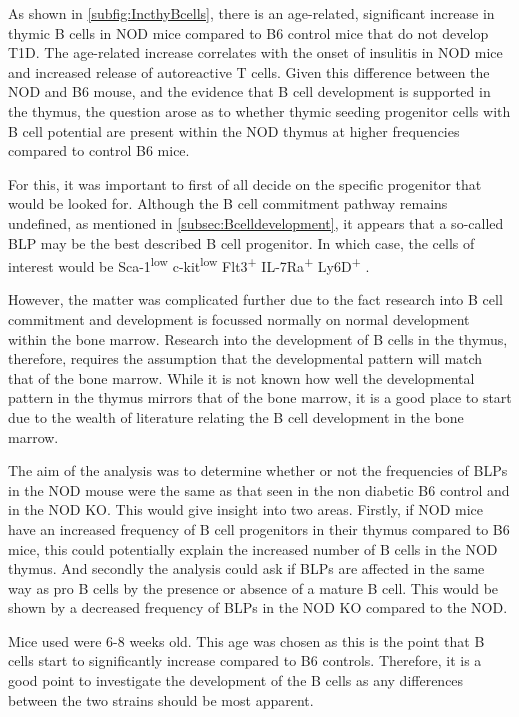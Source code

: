 As shown in \cref{subfig:IncthyBcells}, there is an age-related, significant increase in thymic B cells in NOD mice compared to B6 control mice that do not develop T1D.
The age-related increase correlates with the onset of insulitis in NOD mice and increased release of autoreactive T cells.
Given this difference between the NOD and B6 mouse, and the evidence that B cell development is supported in the thymus, the question arose as to whether thymic seeding progenitor cells with B cell potential are present within the NOD thymus at higher frequencies compared to control B6 mice.

For this, it was important to first of all decide on the specific progenitor that would be looked for.
Although the B cell commitment pathway remains undefined, as mentioned in \cref{subsec:Bcelldevelopment}, it appears that a so-called BLP may be the best described B cell progenitor.
In which case, the cells of interest would be Sca-1\textsuperscript{low} c-kit\textsuperscript{low} Flt3\textsuperscript{+} IL-7Ra\textsuperscript{+} Ly6D\textsuperscript{+} \citep{Mansson2010, Inlay2009, Zhang2013}.

However, the matter was complicated further due to the fact research into B cell commitment and development is focussed normally on normal development within the bone marrow.
Research into the development of B cells in the thymus, therefore, requires the assumption that the developmental pattern will match that of the bone marrow.
While it is not known how well the developmental pattern in the thymus mirrors that of the bone marrow, it is a good place to start due to the wealth of literature relating the B cell development in the bone marrow.

The aim of the analysis was to determine whether or not the frequencies of BLPs in the NOD mouse were the same as that seen in the non diabetic B6 control and in the NOD KO.
This would give insight into two areas.
Firstly, if NOD mice have an increased frequency of B cell progenitors in their thymus compared to B6 mice, this could potentially explain the increased number of B cells in the NOD thymus.
And secondly the analysis could ask if BLPs are affected in the same way as pro B cells by the presence or absence of a mature B cell.
This would be shown by a decreased frequency of BLPs in the NOD KO compared to the NOD.

Mice used were 6-8 weeks old.
This age was chosen as this is the point that B cells start to significantly increase compared to B6 controls.
Therefore, it is a good point to investigate the development of the B cells as any differences between the two strains should be most apparent.



